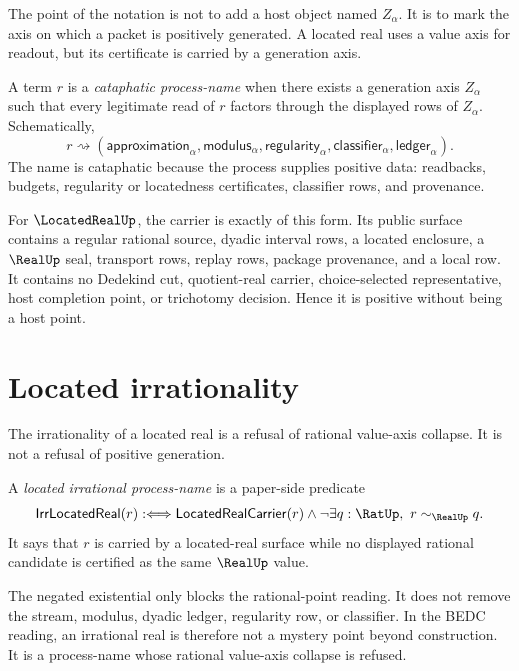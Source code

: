 The point of the notation is not to add a host object named $Z_\alpha$. It is
to mark the axis on which a packet is positively generated. A located real
uses a value axis for readout, but its certificate is carried by a generation
axis.

\begin{definition}
\label{def:cataphatic-process-name}
A term $r$ is a \emph{cataphatic process-name} when there exists a generation
axis $Z_\alpha$ such that every legitimate read of $r$ factors through the
displayed rows of $Z_\alpha$. Schematically,
$$
r \rightsquigarrow
(\mathsf{approximation}_\alpha,
\mathsf{modulus}_\alpha,
\mathsf{regularity}_\alpha,
\mathsf{classifier}_\alpha,
\mathsf{ledger}_\alpha).
$$
The name is cataphatic because the process supplies positive data: readbacks,
budgets, regularity or locatedness certificates, classifier rows, and
provenance.
\end{definition}

For $\LocatedRealUp$, the carrier is exactly of this form. Its public surface
contains a regular rational source, dyadic interval rows, a located enclosure,
a $\RealUp$ seal, transport rows, replay rows, package provenance, and a local
\NameCert{} row. It contains no Dedekind cut, quotient-real carrier,
choice-selected representative, host completion point, or trichotomy
decision. Hence it is positive without being a host point.

\section{Located irrationality}
\label{sec:cataphatic-process-located-irrationality}

The irrationality of a located real is a refusal of rational value-axis
collapse. It is not a refusal of positive generation.

\begin{definition}
\label{def:located-irrational-process-name}
A \emph{located irrational process-name} is a paper-side predicate
$$
\mathsf{IrrLocatedReal}(r)
:\Longleftrightarrow
\mathsf{LocatedRealCarrier}(r)
\wedge
\neg\exists q:\RatUp,\ r\sim_{\RealUp} q.
$$
It says that $r$ is carried by a located-real surface while no displayed
rational candidate is certified as the same $\RealUp$ value.
\end{definition}

The negated existential only blocks the rational-point reading. It does not
remove the stream, modulus, dyadic ledger, regularity row, or classifier. In
the BEDC reading, an irrational real is therefore not a mystery point beyond
construction. It is a process-name whose rational value-axis collapse is
refused.

